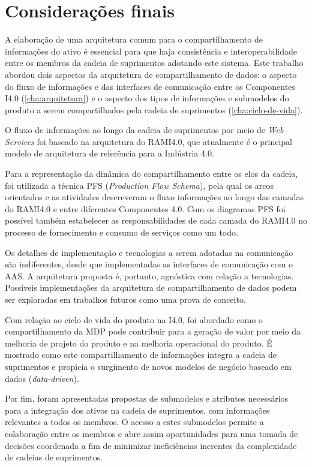 \chapter{Considerações finais}
\label{cha:conclusao}

A elaboração de uma arquitetura comum para o compartilhamento de informações do ativo é essencial para que haja consistência e interoperabilidade entre os membros da cadeia de suprimentos adotando este sistema. Este trabalho abordou dois aspectos da arquitetura de compartilhamento de dados: o aspecto do fluxo de informações e das interfaces de comunicação entre os Componentes I4.0 (\autoref{cha:arquitetura}) e o aspecto dos tipos de informações e submodelos do produto a serem compartilhados pela cadeia de suprimentos (\autoref{cha:ciclo-de-vida}).

O fluxo de informações ao longo da cadeia de suprimentos por meio de \textit{Web Services} foi baseado na arquitetura do RAMI4.0, que atualmente é o principal modelo de arquitetura de referência para a Indústria 4.0.

Para a representação da dinâmica do compartilhamento entre os elos da cadeia, foi utilizada a técnica PFS (\textit{Production Flow Schema}), pela qual os arcos orientados e as atividades descreveram o fluxo informações ao longo das camadas do RAMI4.0 e entre diferentes Componentes 4.0. Com os diagramas PFS foi possível também estabelecer as responsabilidades de cada camada do RAMI4.0 no processo de fornecimento e consumo de serviços como um todo.

Os detalhes de implementação e tecnologias a serem adotadas na comunicação são indiferentes, desde que implementadas as interfaces de comunicação com o AAS. A arquitetura proposta é, portanto, agnóstica com relação a tecnologias. Possíveis implementações da arquitetura de compartilhamento de dados podem ser exploradas em trabalhos futuros como uma prova de conceito.

Com relação ao ciclo de vida do produto na I4.0, foi abordado como o compartilhamento da MDP pode contribuir para a geração de valor por meio da melhoria de projeto do produto e na melhoria operacional do produto. É mostrado como este compartilhamento de informações integra a cadeia de suprimentos e propicia o surgimento de novos modelos de negócio baseado em dados (\textit{data-driven}).

Por fim, foram apresentadas propostas de submodelos e atributos necessários para a integração dos ativos na cadeia de suprimentos. com informações relevantes a todos os membros. O acesso a estes submodelos permite a colaboração entre os membros e abre assim oportunidades para uma tomada de decisões coordenada a fim de minimizar ineficiências inerentes da complexidade de cadeias de suprimentos.

